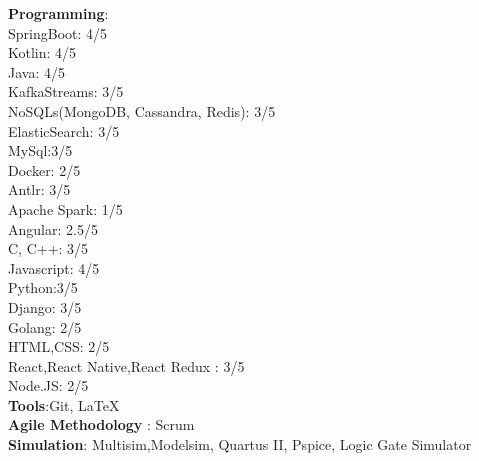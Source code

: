\documentclass[line, mm]{sampleCV}
\begin{document}
\begin{resume}
\textbf{Programming}:\\
SpringBoot: 4/5\\Kotlin: 4/5\\ Java: 4/5 \\ KafkaStreams: 3/5\\NoSQLs(MongoDB, Cassandra, Redis): 3/5 \\ ElasticSearch: 3/5  \\ MySql:3/5 \\Docker: 2/5 \\ Antlr: 3/5 \\  Apache Spark: 1/5\\
Angular: 2.5/5 \\
 C, C++: 3/5\\Javascript: 4/5\\Python:3/5\\ 
 Django: 3/5 \\
 Golang:  2/5 \\
 HTML,CSS: 2/5\\
 React,React Native,React Redux : 3/5 \\Node.JS: 2/5\\ 
\textbf{Tools}:Git, \LaTeX \\
\textbf{Agile Methodology} : Scrum \\
\textbf{Simulation}: Multisim,Modelsim, Quartus II, Pspice, Logic Gate Simulator

\end{resume}
\end{document}
